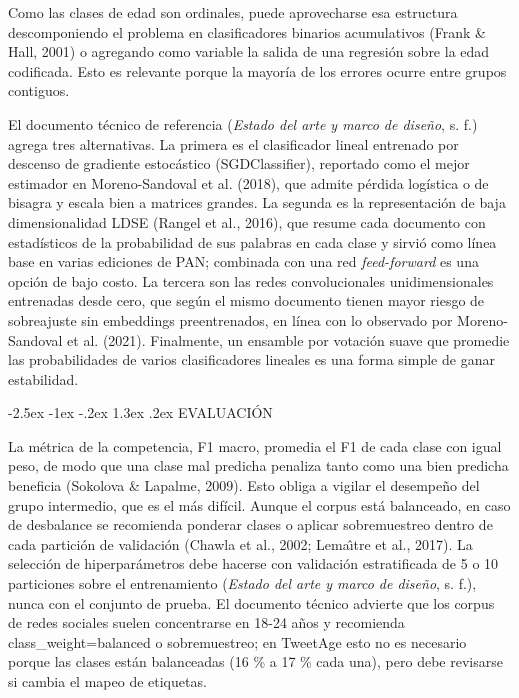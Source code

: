 \documentclass[10pt,twocolumn]{article}
\makeatletter
\renewcommand{\section}{\@startsection{section}{1}{\z@}%
  {-2.5ex \@plus -1ex \@minus -.2ex}%
  {1.3ex \@plus .2ex}%
  {\normalfont\large\bfseries\centering}}
\makeatother
\begin{document}
Como las clases de edad son ordinales, puede aprovecharse esa estructura descomponiendo el problema en clasificadores binarios acumulativos (Frank \& Hall, 2001) o agregando como variable la salida de una regresión sobre la edad codificada. Esto es relevante porque la mayoría de los errores ocurre entre grupos contiguos.

El documento técnico de referencia (\textit{Estado del arte y marco de diseño}, s. f.) agrega tres alternativas. La primera es el clasificador lineal entrenado por descenso de gradiente estocástico (SGDClassifier), reportado como el mejor estimador en Moreno-Sandoval et al. (2018), que admite pérdida logística o de bisagra y escala bien a matrices grandes. La segunda es la representación de baja dimensionalidad LDSE (Rangel et al., 2016), que resume cada documento con estadísticos de la probabilidad de sus palabras en cada clase y sirvió como línea base en varias ediciones de PAN; combinada con una red \textit{feed-forward} es una opción de bajo costo. La tercera son las redes convolucionales unidimensionales entrenadas desde cero, que según el mismo documento tienen mayor riesgo de sobreajuste sin embeddings preentrenados, en línea con lo observado por Moreno-Sandoval et al. (2021). Finalmente, un ensamble por votación suave que promedie las probabilidades de varios clasificadores lineales es una forma simple de ganar estabilidad.


\section{EVALUACIÓN}\label{sec:7}

La métrica de la competencia, F1 macro, promedia el F1 de cada clase con igual peso, de modo que una clase mal predicha penaliza tanto como una bien predicha beneficia (Sokolova \& Lapalme, 2009). Esto obliga a vigilar el desempeño del grupo intermedio, que es el más difícil. Aunque el corpus está balanceado, en caso de desbalance se recomienda ponderar clases o aplicar sobremuestreo dentro de cada partición de validación (Chawla et al., 2002; Lema\^{\i}tre et al., 2017). La selección de hiperparámetros debe hacerse con validación estratificada de 5 o 10 particiones sobre el entrenamiento (\textit{Estado del arte y marco de diseño}, s. f.), nunca con el conjunto de prueba. El documento técnico advierte que los corpus de redes sociales suelen concentrarse en 18-24 años y recomienda class\_weight=\textquotedbl{}balanced\textquotedbl{} o sobremuestreo; en TweetAge esto no es necesario porque las clases están balanceadas (16 \% a 17 \% cada una), pero debe revisarse si cambia el mapeo de etiquetas.
\end{document}
